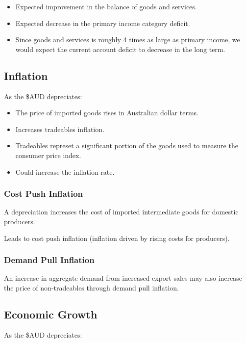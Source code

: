 \documentclass[a4paper,11pt]{article}
\begin{document}
\begin{itemize}
\item Expected improvement in the balance of goods and services.
\item Expected decrease in the primary income category deficit.
\item Since goods and services is roughly 4 times as large as primary income,
	we would expect the current account deficit to decrease in the long term.
\end{itemize}


\subsection{Inflation}

As the \$AUD depreciates:

\begin{itemize}
\item The price of imported goods rises in Australian dollar terms.
\item Increases tradeables inflation.
\item Tradeables represet a significant portion of the goods used to measure
	the consumer price index.
\item Could increase the inflation rate.
\end{itemize}


\subsubsection{Cost Push Inflation}

A depreciation increases the cost of imported intermediate goods for domestic
producers.

Leads to cost push inflation (inflation driven by rising costs for producers).


\subsubsection{Demand Pull Inflation}

An increase in aggregate demand from increased export sales may also increase
the price of non-tradeables through demand pull inflation.


\subsection{Economic Growth}

As the \$AUD depreciates:
\end{document}
